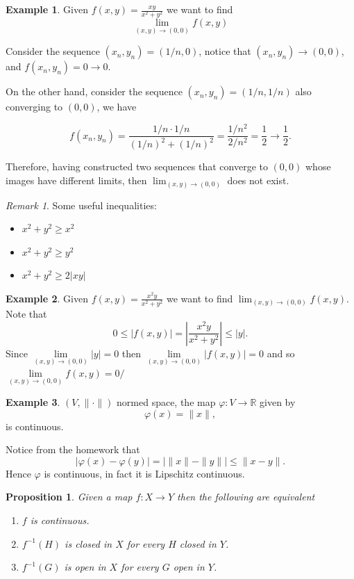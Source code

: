 \documentclass[11pt,openany]{book}
\theoremstyle{plain}
\newtheorem{proposition}{Proposition}[chapter]
\theoremstyle{definition}
\newtheorem{example}{Example}[chapter]
\theoremstyle{remark}
\newtheorem{remark}{Remark}[chapter]
\newcommand{\R}{\mathbb{R}}
\begin{document}
\begin{example} Given
    $f(x,y) = \frac{xy}{x^2+y^2}$ we want to find \[ \lim_{(x,y)\to(0,0)}f(x,y)\] 

    Consider the sequence 
    $(x_n,y_n) = (1/n,0)$, notice that $(x_n,y_n)\to (0,0)$, and $f(x_n,y_n)=0\to 0$. 
    
    On the other hand, consider the sequence $(x_n,y_n) = (1/n,1/n)$ also converging to $(0,0)$, we have 
    
    \[f(x_n,y_n) = \frac{1/n \cdot 1/n}{(1/n)^2+(1/n)^2} = \frac{1/n^2}{2/n^2} = \frac{1}{2}\to \frac12.\] 
    
    Therefore, having constructed two sequences that converge to $(0,0)$ whose images have different limits, then
    $\lim_{(x,y)\to (0,0)}$ does not exist.
\end{example}
\begin{remark}\rm
Some useful inequalities:
    \begin{itemize}
        \item $x^2+y^2 \ge x^2$
        \item $x^2+y^2 \ge y^2$
        \item $x^2+y^2 \ge 2|xy|$
    \end{itemize}
\end{remark}

\begin{example}
    Given $f(x,y) = \frac{x^2y}{x^2+y^2}$ we want to find $\lim_{(x,y)\to(0,0)} f(x,y)$. Note that \[0 \le |f(x,y)|= \left|\frac{x^2y}{x^2+y^2}\right| \le |y|.\]  Since $\lim\limits_{(x,y) \to (0,0)} |y| = 0$ then $\lim\limits_{(x,y) \to (0,0)} |f(x,y)| = 0$ and so $\lim\limits_{(x,y) \to (0,0)} f(x,y) = 0/$
\end{example}

\begin{example}
    $(V, \|\cdot\|)$ normed space, the map $\varphi: V \to \R$ given by $$\varphi(x) = \|x\|,$$
    is continuous.

  Notice from the homework that
  $$|\varphi(x)-\varphi(y)|=\Big| \|x\|-\|y\| \Big|\leq \|x-y\|.$$
  Hence $\varphi$ is continuous, in fact it is Lipschitz continuous.
\end{example}

\begin{proposition}
    Given a map $f: X\to Y$ then the following are equivalent
    \begin{enumerate}
        \item $f$ is continuous.
        \item $f^{-1}(H)$ is closed in $X$ for every $H$ closed in $Y$.
        \item $f^{-1}(G)$ is open in $X$ for every $G$ open in $Y$.  
    \end{enumerate}
\end{proposition}
\end{document}
